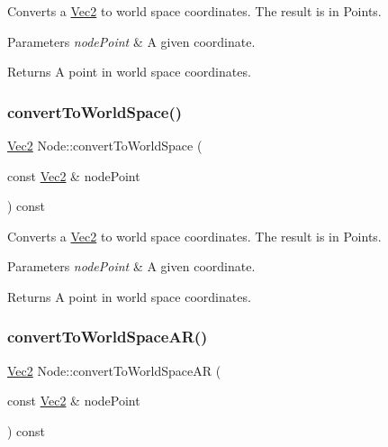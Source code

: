 Converts a \hyperlink{classVec2}{Vec2} to world space coordinates. The result is in Points.


\begin{DoxyParams}{Parameters}
{\em node\+Point} & A given coordinate. \\
\hline
\end{DoxyParams}
\begin{DoxyReturn}{Returns}
A point in world space coordinates. 
\end{DoxyReturn}
\mbox{\label{classNode_a9da42e3d980d42aa9508a9de1b51040b}} 
\subsubsection{\texorpdfstring{convert\+To\+World\+Space()}{convertToWorldSpace()}\hspace{0.1cm}{\footnotesize\ttfamily [2/2]}}
{\footnotesize\ttfamily \hyperlink{classVec2}{Vec2} Node\+::convert\+To\+World\+Space (\begin{DoxyParamCaption}\item[{const \hyperlink{classVec2}{Vec2} \&}]{node\+Point }\end{DoxyParamCaption}) const}

Converts a \hyperlink{classVec2}{Vec2} to world space coordinates. The result is in Points.


\begin{DoxyParams}{Parameters}
{\em node\+Point} & A given coordinate. \\
\hline
\end{DoxyParams}
\begin{DoxyReturn}{Returns}
A point in world space coordinates. 
\end{DoxyReturn}
\mbox{\label{classNode_a84c532f970a06aec83dc881e70526b8e}} 
\subsubsection{\texorpdfstring{convert\+To\+World\+Space\+A\+R()}{convertToWorldSpaceAR()}\hspace{0.1cm}{\footnotesize\ttfamily [1/2]}}
{\footnotesize\ttfamily \hyperlink{classVec2}{Vec2} Node\+::convert\+To\+World\+Space\+AR (\begin{DoxyParamCaption}\item[{const \hyperlink{classVec2}{Vec2} \&}]{node\+Point }\end{DoxyParamCaption}) const}

